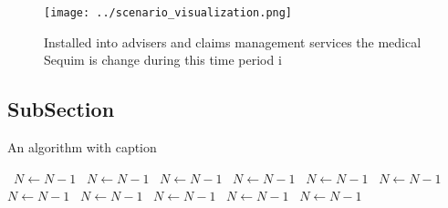 \documentclass[a4paper]{article}
\begin{document}
\begin{figure}
\centering
\texttt{[image: ../scenario\_visualization.png]}
\caption{Installed into advisers and claims management services the medical Sequim is change during this time period i
}
\end{figure}
 
\subsection{SubSection}

\begin{algorithm}
\caption{An algorithm with caption}
\begin{algorithmic}
\    \State $N \gets N - 1$
\    \State $N \gets N - 1$
\    \State $N \gets N - 1$
\    \State $N \gets N - 1$
\    \State $N \gets N - 1$
\    \State $N \gets N - 1$
\    \State $N \gets N - 1$
\    \State $N \gets N - 1$
\    \State $N \gets N - 1$
\    \State $N \gets N - 1$
\    \State $N \gets N - 1$
\EndWhile
\end{algorithmic}
\end{algorithm}
\end{document}
